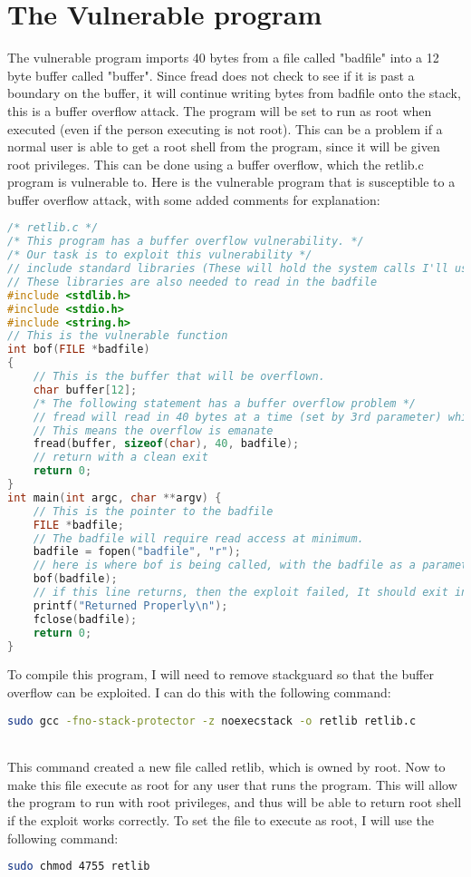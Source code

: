\documentclass[14pt]{extarticle}
\begin{document}
\section{The Vulnerable program}
The vulnerable program imports 40 bytes from a file called "badfile" into a 12 byte buffer called "buffer". Since fread does not check to see if it is past a boundary on the buffer, it will continue writing bytes from badfile onto the stack, this is a buffer overflow attack. The program will be set to run as root when executed (even if the person executing is not root). This can be a problem if a normal user is able to get a root shell from the program, since it will be given root privileges. This can be done using a buffer overflow, which the retlib.c program is vulnerable to\cite{seed-retlibc}.
Here is the vulnerable program that is susceptible to a buffer overflow attack, with some added comments for explanation:
\begin{lstlisting}[language=c]
/* retlib.c */
/* This program has a buffer overflow vulnerability. */
/* Our task is to exploit this vulnerability */
// include standard libraries (These will hold the system calls I'll use in the exploit)
// These libraries are also needed to read in the badfile
#include <stdlib.h>
#include <stdio.h>
#include <string.h>
// This is the vulnerable function
int bof(FILE *badfile)
{
	// This is the buffer that will be overflown.
	char buffer[12];
	/* The following statement has a buffer overflow problem */
	// fread will read in 40 bytes at a time (set by 3rd parameter) which is much larger than the 12 byte buffer set above.
	// This means the overflow is emanate
	fread(buffer, sizeof(char), 40, badfile);
	// return with a clean exit
	return 0;
}
int main(int argc, char **argv) {
	// This is the pointer to the badfile
	FILE *badfile;
	// The badfile will require read access at minimum.
	badfile = fopen("badfile", "r");
	// here is where bof is being called, with the badfile as a parameter
	bof(badfile);
	// if this line returns, then the exploit failed, It should exit in the bof function if done correctly.
	printf("Returned Properly\n");
	fclose(badfile);
	return 0;
}
\end{lstlisting}
To compile this program, I will need to remove stackguard so that the buffer overflow can be exploited. I can do this with the following command:
\begin{lstlisting}[language=sh]
sudo gcc -fno-stack-protector -z noexecstack -o retlib retlib.c
\end{lstlisting}\cite{seed-retlibc}\\
This command created a new file called retlib, which is owned by root. Now to make this file execute as root for any user that runs the program. This will allow the program to run with root privileges, and thus will be able to return root shell if the exploit works correctly. To set the file to execute as root, I will use the following command:
\begin{lstlisting}[language=sh]
sudo chmod 4755 retlib
\end{lstlisting}\cite{seed-retlibc}
\end{document}
